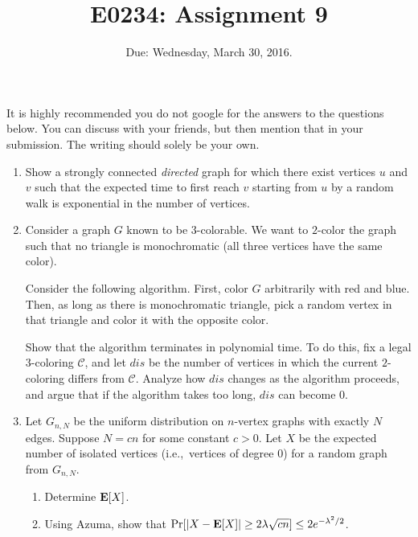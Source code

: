 \documentclass[11pt]{article}
\begin{document}
\def\Exp{\mathbf{Exp}}
\def\Var{\mathbf{Var}}
\title{E0234: Assignment 9}
\author{}
\date{Due: Wednesday, March 30, 2016.}
\maketitle
It is highly recommended you do not google for the answers to the questions below. You can discuss with your friends, but then mention that in your submission.
The writing should solely be your own.

\begin{enumerate}
\item 
Show a strongly connected {\em directed} graph for which there exist vertices $u$ and $v$ such that the expected time to first reach $v$ starting from $u$ by a random walk is exponential in the number of vertices.

\item
Consider a graph $G$ known to be $3$-colorable. We want to $2$-color the graph such that no triangle is monochromatic (all three vertices have the same color).

Consider the following algorithm. First, color $G$ arbitrarily with red and blue. Then, as long as there is monochromatic triangle, pick a random vertex in that triangle and color it with the opposite color.

Show that the algorithm terminates in polynomial time. To do this, fix a legal $3$-coloring $\mathcal{C}$, and let $dis$ be the number of vertices in which the current $2$-coloring differs from $\mathcal{C}$. Analyze how $dis$ changes as the algorithm proceeds, and argue that if the algorithm takes too long, $dis$ can become $0$.

\item
Let $G_{n,N}$ be the uniform distribution on $n$-vertex graphs with exactly $N$ edges. Suppose $N = cn$ for some constant $c > 0$. Let $X$ be the expected number of isolated vertices (i.e.,~vertices of degree $0$) for a random graph from $G_{n,N}$. 
\begin{enumerate}
\item
Determine $\hbox{\bf E}[X]$.
\item
Using Azuma, show that $\Pr[|X - \hbox{\bf E}[X]| \geq 2 \lambda \sqrt{cn}] \leq 2e^{-\lambda^2/2}$. 
\end{enumerate}


\end{enumerate}
\end{document}
